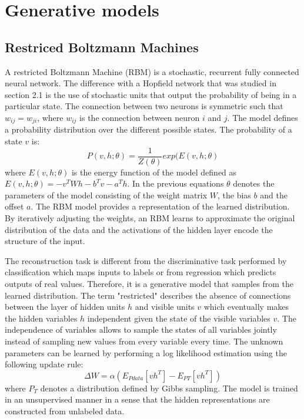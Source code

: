 \documentclass[conference,compsoc]{IEEEtran}
\begin{document}
\section{Generative models}

\subsection{Restriced Boltzmann Machines}

A restricted Boltzmann Machine (RBM) is a stochastic, recurrent fully connected neural network.  The difference with a Hopfield network that was studied in section 2.1 is the use of stochastic units that output the probability of being in a particular state.
 The connection between two neurons is symmetric such that $w_{ij}=w_{ji}$, where $w_{ij}$ is the connection between neuron $i$ and $j$. The model defines a probability distribution over the different possible states. The probability of a state $v$ is:
\begin{equation}
P(v,h;\theta)=\frac{1}{Z(\theta)}exp(E(v,h;\theta)
\end{equation}
where $E(v,h;\theta)$ is the energy function of the model defined as $E(v,h;\theta)=-v^TWh-b^Tv-a^Th$. In the previous equations $\theta$ denotes the parameters of the model consisting of the weight matrix $W$, the bias $b$ and the offset $a$. The RBM model provides a representation of the learned distribution. By iteratively adjusting the weights, an RBM learns to approximate the original distribution of the data and the activations of the hidden layer encode the structure of the input.

The reconstruction task is different from the discriminative task performed by classification which maps inputs to labels or from regression which predicts outputs of real values. Therefore, it is a generative model that samples from the learned distribution. The term "restricted" describes the absence of connections between the layer of hidden units $h$ and visible units $v$ which eventually makes the hidden variables $h$ independent given the state of the visible variables $v$. The independence of variables allows to sample the states of all variables jointly instead of sampling new values from every variable every time.
The unknown parameters can be learned by performing a log likelihood
estimation using the following update rule: 
\begin{equation}
\Delta W=\alpha (E_{Pdata}[vh^T]-E_{PT}[vh^T])
\end{equation}
where $P_T$ denotes a distribution defined by Gibbs sampling. The model is trained in an unsupervised manner in a sense that the hidden representations are constructed from unlabeled data. 
\end{document}
